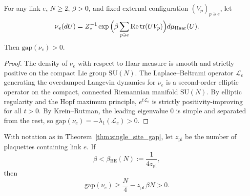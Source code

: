 \begin{theorem}
\label{thm:single_site_gap}
For any link $e$, $N\ge{}2$, $\beta{}>0$, and fixed external configuration $(V_p)_{p\ni{} e}$, let
\begin{equation*}
  \nu{}_e(dU) = Z_e^{-1}\exp{}\Bigl(\beta{}\sum\limits_{p\ni{} e}\operatorname{Re}\operatorname{tr}(UV_p)\Bigr)d\mu{}_{\mathrm{Haar}}(U).
\end{equation*}
Then $\mathrm{gap}(\nu{}_e)>0$.
\end{theorem}

\begin{proof}
The density of $\nu{}_e$ with respect to Haar measure is smooth and strictly positive
on the compact Lie group $\mathrm{SU}(N)$.
The Laplace--Beltrami operator $\mathcal{L}_e$ generating the overdamped Langevin
dynamics for $\nu{}_e$ is a second-order elliptic operator on the compact,
connected Riemannian manifold $\mathrm{SU}(N)$.
By elliptic regularity and the Hopf maximum principle, $e^{t\mathcal{L}_e}$ is strictly
positivity-improving for all $t>0$.
By Krein--Rutman, the leading eigenvalue $0$ is simple and separated from the rest,
so $\mathrm{gap}(\nu{}_e)=-\lambda{}_1(\mathcal{L}_e)>0$.
\end{proof}

\begin{theorem}
\label{thm:bakry_emery}
With notation as in Theorem~\ref{thm:single_site_gap},
let $z_{\mathrm{pl}}$ be the number of plaquettes containing link $e$. If
\begin{equation*}
  \beta{} < \beta{}_{\mathrm{BE}}(N) := \frac{1}{4z_{\mathrm{pl}}},
\end{equation*}
then
\begin{equation}
\label{eq:be_bound}
  \mathrm{gap}(\nu{}_e) \ge{} \frac{N}{4} - z_{\mathrm{pl}}\,{}\beta{} N > 0.
\end{equation}
\end{theorem}

